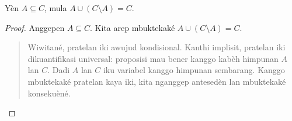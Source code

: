 \documentclass[../../../include/open-logic-section]{subfiles}
\begin{document}


\begin{prop}
Yèn $A \subseteq C$, mula $A \cup (C \setminus A) = C$.
\end{prop}

\begin{proof}
  Anggepen $A \subseteq C$. Kita arep mbuktekaké
  $A \cup (C \setminus A) = C$.
  \begin{quote}
    Wiwitané, pratelan iki awujud kondisional. Kanthi
    implisit, pratelan iki dikuantifikasi universal: proposisi
    mau bener kanggo kabèh himpunan $A$ lan $C$. Dadi $A$ lan
    $C$ iku variabel kanggo himpunan sembarang. Kanggo
    mbuktekaké pratelan kaya iki, kita nganggep antesedèn
    lan mbuktekaké konsekuèné.


\end{quote}
\end{proof}
\end{document}
